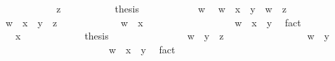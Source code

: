 \begin{isabellebody}
\isanewline
\ \ \ \ \ \ \isamarkupfalse%
\ \isamarkupfalse%
\ {\isachardoublequoteopen}{\isasymdots}\ {\isasymsqsubseteq}\ z{\isachardoublequoteclose}\ \isacommand{{\isachardot}{\isachardot}}\isamarkupfalse%
\isanewline
\ \ \ \ \ \ \isamarkupfalse%
\ \isamarkupfalse%
\ {\isacharquery}thesis\ \isacommand{{\isachardot}}\isamarkupfalse%
\isanewline
\ \ \ \ \isamarkupfalse%
\isanewline
\ \ \ \ \isamarkupfalse%
\ w\ \isamarkupfalse%
\ {\isachardoublequoteopen}w\ {\isasymsqsubseteq}\ x\ {\isasymsqinter}\ y{\isachardoublequoteclose}\ \ {\isachardoublequoteopen}w\ {\isasymsqsubseteq}\ z{\isachardoublequoteclose}\isanewline
\ \ \ \ \isamarkupfalse%
\ {\isachardoublequoteopen}w\ {\isasymsqsubseteq}\ x\ {\isasymsqinter}\ {\isacharparenleft}y\ {\isasymsqinter}\ z{\isacharparenright}{\isachardoublequoteclose}\isanewline
\ \ \ \ \isamarkupfalse%
\isanewline
\ \ \ \ \ \ \isamarkupfalse%
\ {\isachardoublequoteopen}w\ {\isasymsqsubseteq}\ x{\isachardoublequoteclose}\isanewline
\ \ \ \ \ \ \isamarkupfalse%
\ {\isacharminus}\isanewline
\ \ \ \ \ \ \ \ \isamarkupfalse%
\ {\isachardoublequoteopen}w\ {\isasymsqsubseteq}\ x\ {\isasymsqinter}\ y{\isachardoublequoteclose}\ \isamarkupfalse%
\ fact\isanewline
\ \ \ \ \ \ \ \ \isamarkupfalse%
\ \isamarkupfalse%
\ {\isachardoublequoteopen}{\isasymdots}\ {\isasymsqsubseteq}\ x{\isachardoublequoteclose}\ \isacommand{{\isachardot}{\isachardot}}\isamarkupfalse%
\isanewline
\ \ \ \ \ \ \ \ \isamarkupfalse%
\ \isamarkupfalse%
\ {\isacharquery}thesis\ \isacommand{{\isachardot}}\isamarkupfalse%
\isanewline
\ \ \ \ \ \ \isamarkupfalse%
\isanewline
\ \ \ \ \ \ \isamarkupfalse%
\ {\isachardoublequoteopen}w\ {\isasymsqsubseteq}\ y\ {\isasymsqinter}\ z{\isachardoublequoteclose}\isanewline
\ \ \ \ \ \ \isamarkupfalse%
\isanewline
\ \ \ \ \ \ \ \ \isamarkupfalse%
\ {\isachardoublequoteopen}w\ {\isasymsqsubseteq}\ y{\isachardoublequoteclose}\isanewline
\ \ \ \ \ \ \ \ \isamarkupfalse%
\ {\isacharminus}\isanewline
\ \ \ \ \ \ \ \ \ \ \isamarkupfalse%
\ {\isachardoublequoteopen}w\ {\isasymsqsubseteq}\ x\ {\isasymsqinter}\ y{\isachardoublequoteclose}\ \isamarkupfalse%
\ fact\isanewline
\ \ \ \ \ \ \ \ \ \ \isamarkupfalse%

\end{isabellebody}
